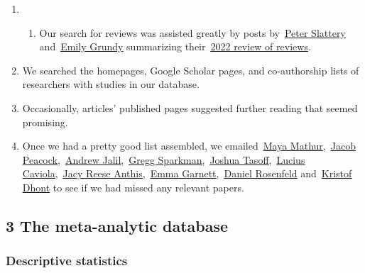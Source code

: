 \documentclass[
  man]{apa6}
\providecommand{\tightlist}{%
  \setlength{\itemsep}{0pt}\setlength{\parskip}{0pt}}
\begin{document}
\begin{enumerate}
\def\labelenumi{\arabic{enumi}.}
\item
  \begin{enumerate}
  \def\labelenumii{\arabic{enumii}.}
  \tightlist
  \item
    Our search for reviews was assisted greatly by posts by~\href{https://forum.effectivealtruism.org/posts/Sy7swEetrtcK2C7q6/research-summary-a-meta-review-of-interventions-that}{\ul{Peter Slattery}} and~\href{https://forum.effectivealtruism.org/posts/azHZ2pQj9JgdZLC63/what-interventions-influence-animal-product-consumption}{\ul{Emily Grundy}} summarizing their~\href{https://www.sciencedirect.com/science/article/pii/S2666833521000976\#!}{\ul{2022 review of reviews}}.
  \end{enumerate}
\item
  We searched the homepages, Google Scholar pages, and co-authorship lists of researchers with studies in our database.
\item
  Occasionally, articles' published pages suggested further reading that seemed promising.
\item
  Once we had a pretty good list assembled, we emailed~\href{https://www.mayamathur.com/}{\ul{Maya Mathur}},~\href{https://www.jacobpeacock.com/}{\ul{Jacob Peacock}},~\href{https://www.oxy.edu/academics/faculty/andrew-jalil}{\ul{Andrew Jalil}},~\href{https://www.bc.edu/bc-web/schools/mcas/departments/psychology/people/faculty-directory/gregg-sparkman.html}{\ul{Gregg Sparkman}},~\href{https://scholar.cgu.edu/joshua-tasoff/}{\ul{Joshua Tasoff}},~\href{https://luciuscaviola.com/}{\ul{Lucius Caviola}},~\href{https://jacyanthis.com/}{\ul{Jacy Reese Anthis}},~\href{https://www.phc.ox.ac.uk/team/emma-garnett}{\ul{Emma Garnett}},~\href{https://www.daniellrosenfeld.com/}{\ul{Daniel Rosenfeld}} and~\href{https://www.kent.ac.uk/psychology/people/220/dhont-kristof}{\ul{Kristof Dhont}} to see if we had missed any relevant papers.~
\end{enumerate}

\subsection{3 The meta-analytic database}\label{the-meta-analytic-database}

\subsubsection{Descriptive statistics}\label{descriptive-statistics}
\end{document}
